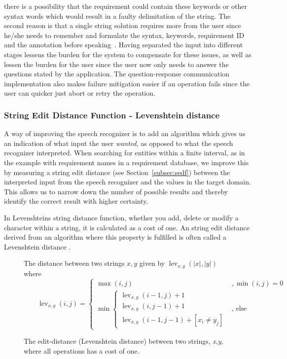 there is a possibility that the requirement could contain these keywords or other syntax words which would result in a faulty delimitation of the string. 
The second reason is that a single string solution requires more from  the user since he/she needs to remember and formulate the syntax, keywords, requirement ID and the annotation before speaking~\citep{memoryCap}. 
Having separated the input into different stages lessens the burden for the system to compensate for these issues, as well as lessen the burden for the user since the user now only needs to answer the questions stated by the application. 
The question-response communication implementation also makes failure mitigation easier if an operation fails since the user can quicker just abort or retry the operation.

\subsubsection{String Edit Distance Function - Levenshtein distance}
\label{subsubsec:stringmetric}
A way of improving the speech recognizer is to add an algorithm which gives us an indication of what input the user \emph{wanted}, as opposed to what the speech recognizer interpreted. When searching for entities within a finite interval, as in the example with requirement names in a requirement database, we improve this by measuring a string edit distance (see Section~\ref{subsec:sedf}) between the interpreted input from the speech recognizer and the values in the target domain. This allows us to narrow down the number of possible results and thereby identify the correct result with higher certainty.

In Levenshteins string distance function, whether you add, delete or modify a character within a string, it is calculated as a cost of one. An string edit distance derived from an algorithm where this property is fulfilled is often called a Levenshtein distance \citep{blockeel2004}. 

\begin{figure}
\centering
    The distance between two strings \(x,y\) given by \(\operatorname{lev}_{x,y}(|x|,|y|)\) where \\  
    $\qquad\operatorname{lev}_{x,y}(i,j) = \begin{cases}
      \max(i,j) &, \min(i,j)=0 \\
      \min \begin{cases}
              \operatorname{lev}_{x,y}(i-1,j) + 1 \\
              \operatorname{lev}_{x,y}(i,j-1) + 1 \\
              \operatorname{lev}_{x,y}(i-1,j-1) + [x_i \neq y_j]
           \end{cases} &, \text{ else}
    \end{cases}
    $
    \caption{The edit-distance (Levenshtein distance) between two strings, \emph{x},\emph{y}, where all operations has a cost of one.}
\end{figure}

